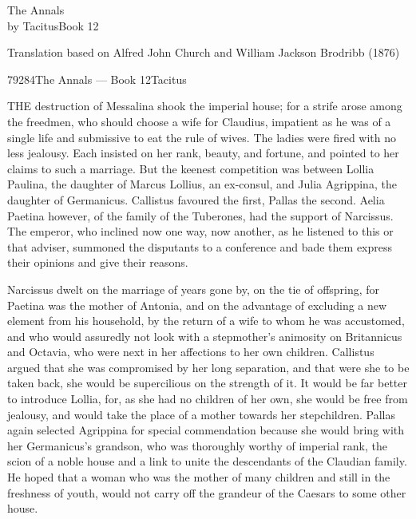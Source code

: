 
The Annals\\
by TacitusBook 12

Translation based on Alfred John Church and William Jackson Brodribb (1876)

79284The Annals — Book 12Tacitus


THE destruction of Messalina shook the imperial house; for a strife arose among the freedmen, who should choose a wife for Claudius, impatient as he was of a single life and submissive to eat the rule of wives. The ladies were fired with no less jealousy. Each insisted on her rank, beauty, and fortune, and pointed to her claims to such a marriage. But the keenest competition was between Lollia Paulina, the daughter of Marcus Lollius, an ex-consul, and Julia Agrippina, the daughter of Germanicus. Callistus favoured the first, Pallas the second. Aelia Paetina however, of the family of the Tuberones, had the support of Narcissus. The emperor, who inclined now one way, now another, as he listened to this or that adviser, summoned the disputants to a conference and bade them express their opinions and give their reasons.


Narcissus dwelt on the marriage of years gone by, on the tie of offspring, for Paetina was the mother of Antonia, and on the advantage of excluding a new element from his household, by the return of a wife to whom he was accustomed, and who would assuredly not look with a stepmother's animosity on Britannicus and Octavia, who were next in her affections to her own children. Callistus argued that she was compromised by her long separation, and that were she to be taken back, she would be supercilious on the strength of it. It would be far better to introduce Lollia, for, as she had no children of her own, she would be free from jealousy, and would take the place of a mother towards her stepchildren. Pallas again selected Agrippina for special commendation because she would bring with her Germanicus's grandson, who was thoroughly worthy of imperial rank, the scion of a noble house and a link to unite the descendants of the Claudian family. He hoped that a woman who was the mother of many children and still in the freshness of youth, would not carry off the grandeur of the Caesars to some other house.


